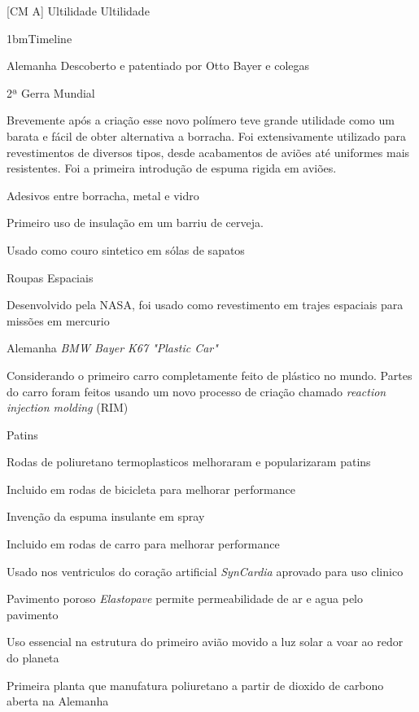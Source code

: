 \documentclass[\mainfilename]{subfiles}
\begin{document}
\graphicspath{{\subfix{./.build/figures/CM_A-Trabalho.3}}}

[CM A]
{Ultilidade} %
{Ultilidade} %

\begin{sectionBox}1bm{Timeline\cite{Polyurethanes_2022}} %
    
    \begin{description}[
        leftmargin=!,
        labelwidth=\widthof{} %
    ]
        \item[1937] Alemanha Descoberto e patentiado por Otto Bayer e colegas
        \item[1940] 2ª Gerra Mundial\par
            Brevemente após a criação esse novo polímero teve grande utilidade como um barata e fácil de obter alternativa a borracha.
            Foi extensivamente utilizado para revestimentos de diversos tipos, desde acabamentos de aviões até uniformes mais resistentes. Foi a primeira introdução de espuma rigida em aviões.
        \item[1941] Adesivos entre borracha, metal e vidro
        \item[1948] Primeiro uso de insulação em um barriu de cerveja.
        \item[1953] Usado como couro sintetico em sólas de sapatos
        \item[1959] Roupas Espaciais\par
            Desenvolvido pela NASA, foi usado como revestimento em trajes espaciais para missões em mercurio
        \item[1967] Alemanha \textit{BMW Bayer K67 "Plastic Car"}\par
            Considerando o primeiro carro completamente feito de plástico no mundo.
            Partes do carro foram feitos usando um novo processo de criação chamado \textit{reaction injection molding} (RIM)
        \item[1973] Patins\par
            Rodas de poliuretano termoplasticos melhoraram e popularizaram patins
        \item[1995] Incluido em rodas de bicicleta para melhorar performance
        \item[1979] Invenção da espuma insulante em spray
        \item[2001] Incluido em rodas de carro para melhorar performance
        \item[2004] Usado nos ventriculos do coração artificial \textit{SynCardia} aprovado para uso clinico
        \item[2008] Pavimento poroso \textit{Elastopave} permite permeabilidade de ar e agua pelo pavimento
        \item[2010] Uso essencial na estrutura do primeiro avião movido a luz solar a voar ao redor do planeta
        \item[2011] Primeira planta que manufatura poliuretano a partir de dioxido de carbono aberta na Alemanha
    \end{description}
\end{sectionBox}
\end{document}
